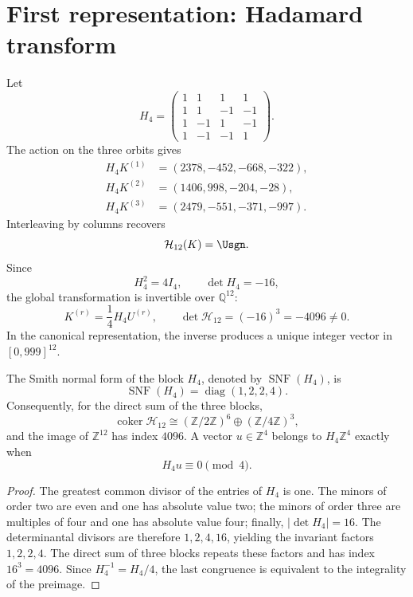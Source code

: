 \section{First representation: Hadamard transform}

Let
\[
H_4=
\begin{pmatrix}
1&1&1&1\\
1&1&-1&-1\\
1&-1&1&-1\\
1&-1&-1&1
\end{pmatrix}.
\]
The action on the three orbits gives
\[
\begin{aligned}
H_4K^{(1)}&=(2378,-452,-668,-322),\\
H_4K^{(2)}&=(1406,998,-204,-28),\\
H_4K^{(3)}&=(2479,-551,-371,-997).
\end{aligned}
\]
Interleaving by columns recovers
\[
\mathcal H_{12}(K)=\Usgn.
\]
Since
\[
H_4^2=4I_4,
\qquad
\det H_4=-16,
\]
the global transformation is invertible over \(\mathbb Q^{12}\):
\[
K^{(r)}=\frac14H_4U^{(r)},
\qquad
\det\mathcal H_{12}=(-16)^3=-4096\ne0.
\]
In the canonical representation, the inverse produces a unique integer vector in
\([0,999]^{12}\).

\begin{theorem}
\label{thm:smith-hadamard}
The Smith normal form of the block \(H_4\), denoted by
\(\operatorname{SNF}(H_4)\), is
\[
 \operatorname{SNF}(H_4)=\operatorname{diag}(1,2,2,4).
\]
Consequently, for the direct sum of the three blocks,
\[
 \operatorname{coker}\mathcal H_{12}
 \cong(\mathbb Z/2\mathbb Z)^6\oplus(\mathbb Z/4\mathbb Z)^3,
\]
and the image of \(\mathbb Z^{12}\) has index \(4096\). A vector
\(u\in\mathbb Z^4\) belongs to \(H_4\mathbb Z^4\) exactly when
\[
 H_4u\equiv0\pmod 4.
\]
\end{theorem}

\begin{proof}
The greatest common divisor of the entries of \(H_4\) is one. The minors of
order two are even and one has absolute value two; the minors of order
three are multiples of four and one has absolute value four; finally,
\(\lvert\det H_4\rvert=16\). The determinantal divisors are
therefore \(1,2,4,16\), yielding the invariant factors
\(1,2,2,4\). The direct sum of three blocks repeats these factors and has
index \(16^3=4096\). Since \(H_4^{-1}=H_4/4\), the last
congruence is equivalent to the integrality of the preimage.
\end{proof}

